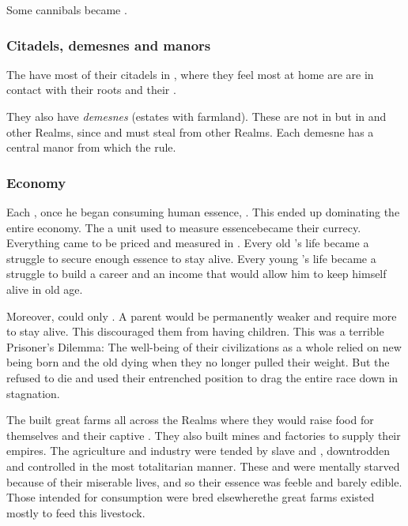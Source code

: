 Some cannibals became . 





\subsubsection{Citadels, demesnes and manors}
The \resphain{} have most of their citadels in , where they feel most at home are are in contact with their roots and their . 

They also have \emph{demesnes} (estates with farmland). 
These are not in \Nyx{} but in  and other  Realms, since  and must steal from other Realms. 
Each demesne has a central manor from which the \resphain{} rule. 







\subsubsection{Economy}
\index{\jal}
Each \resphan, once he began consuming human essence, . 
This ended up dominating the entire \resphan economy. 
The \jal\dash a unit used to measure essence\dash became their currecy. 
Everything came to be priced and measured in \jal. 
Every old \resphan's life became a struggle to secure enough essence to stay alive.
Every young \resphan's life became a struggle to build a career and an income that would allow him to keep himself alive in old age. 

Moreover, \resphain could only . 
A parent would be permanently weaker and require more \jal to stay alive. 
This discouraged them from having children. 
This was a terrible Prisoner's Dilemma: 
The well-being of their civilizations as a whole relied on new \resphain being born and the old \resphain dying when they no longer pulled their weight. 
But the  refused to die and used their entrenched position to drag the entire \resphan race down in stagnation. 

The \resphain built great farms all across the Realms where they would raise food for themselves and their captive \humans.
They also built mines and factories to supply their empires. 
The agriculture and industry were tended by slave \humans and \nephilim, downtrodden and controlled in the most totalitarian manner. 
These \humans and \nephilim were mentally starved because of their miserable lives, and so their essence was feeble and barely edible. 
Those \humans intended for \resphan consumption were bred elsewhere\dash the great farms existed mostly to feed this \human livestock. 


